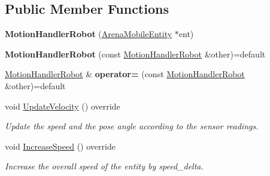 \subsection*{Public Member Functions}
\begin{DoxyCompactItemize}
\item 
\mbox{\label{class_motion_handler_robot_a4b52a0b181837a8d63c39f71811d691b}} 
{\bfseries Motion\+Handler\+Robot} (\mbox{\hyperlink{class_arena_mobile_entity}{Arena\+Mobile\+Entity}} $\ast$ent)
\item 
\mbox{\label{class_motion_handler_robot_a66445cc9057e3ef9298b5bd239df6d4e}} 
{\bfseries Motion\+Handler\+Robot} (const \mbox{\hyperlink{class_motion_handler_robot}{Motion\+Handler\+Robot}} \&other)=default
\item 
\mbox{\label{class_motion_handler_robot_a48181f197ffb864f16e29721ad964e4a}} 
\mbox{\hyperlink{class_motion_handler_robot}{Motion\+Handler\+Robot}} \& {\bfseries operator=} (const \mbox{\hyperlink{class_motion_handler_robot}{Motion\+Handler\+Robot}} \&other)=default
\item 
\mbox{\label{class_motion_handler_robot_acd2cdb615d806dcf809142e84569ca9d}} 
void \mbox{\hyperlink{class_motion_handler_robot_acd2cdb615d806dcf809142e84569ca9d}{Update\+Velocity}} () override
\begin{DoxyCompactList}\small\item\em Update the speed and the pose angle according to the sensor readings. \end{DoxyCompactList}\item 
\mbox{\label{class_motion_handler_robot_a93ea16501b7b8c0bd78edb2681aa3b6d}} 
void \mbox{\hyperlink{class_motion_handler_robot_a93ea16501b7b8c0bd78edb2681aa3b6d}{Increase\+Speed}} () override
\begin{DoxyCompactList}\small\item\em Increase the overall speed of the entity by speed\+\_\+delta. \end{DoxyCompactList}\item 
\mbox{\label{class_motion_handler_robot_a89e9b8b4e22fb021d7d67c817e66b7b2}} 

\end{DoxyCompactItemize}
